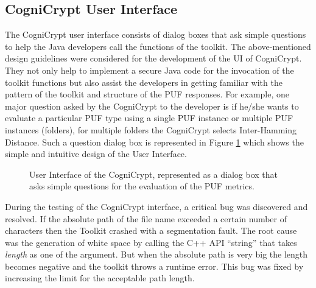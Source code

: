 \subsection{CogniCrypt User Interface}
The CogniCrypt user interface consists of dialog boxes that ask simple questions to help the Java developers call the functions of the toolkit.
The above-mentioned design guidelines were considered for the development of the UI of CogniCrypt. They not only help to implement a secure Java code for the invocation of the toolkit functions but also assist the developers in getting familiar with the pattern of the toolkit and structure of the PUF responses. For example, one major question asked by the CogniCrypt to the developer is if he/she wants to evaluate a particular PUF type using a single PUF instance or multiple PUF instances (folders), for multiple
folders the CogniCrypt selects Inter-Hamming Distance. Such a question dialog box is represented in Figure \ref{img:cogni_ui} which shows the simple and intuitive design of the User Interface.\\
\begin{figure}[h!]
\centering
{}
\caption{User Interface of the CogniCrypt, represented as a dialog box that asks simple questions for the evaluation of the PUF metrics.}
\label{img:cogni_ui}
\end{figure}

During the testing of the CogniCrypt interface, a critical bug was discovered and resolved. If the absolute path of the file name exceeded a certain number of characters then the Toolkit crashed with a segmentation fault. The root cause was the generation of white space by calling the C++ API ``string'' that takes \emph{length} as one of the argument. But when the absolute path is very big the length becomes negative and the toolkit throws a runtime error. This bug was fixed by increasing
the limit for the acceptable path length.\\

